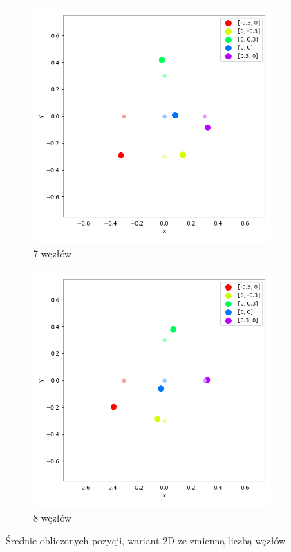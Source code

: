 \begin{figure}[H]
    \ContinuedFloat\centering
    \begin{subfigure}{.5\textwidth}
        \centering
        \includegraphics[width=\linewidth]{pics/mult_lat_2d_num/positions_7_mean.png}
        \caption{7 węzłów}
        \label{pic:2d_7_num_mult}
    \end{subfigure}%
    \begin{subfigure}{.5\textwidth}
        \centering
        \includegraphics[width=\linewidth]{pics/mult_lat_2d_num/positions_8_mean.png}
        \caption{8 węzłów}
        \label{pic:2d_8_num_mult}
    \end{subfigure}
    \caption{Średnie obliczonych pozycji, wariant 2D ze zmienną liczbą węzłów}
    \label{fig:2d_num_mult}
\end{figure}

